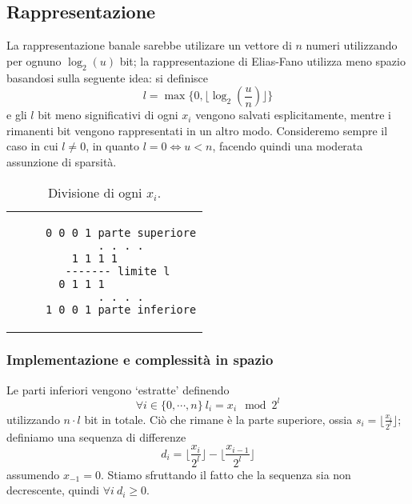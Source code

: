 \subsection{Rappresentazione}
La rappresentazione banale sarebbe utilizare un vettore di $n$ numeri
utilizzando per ognuno $\log_2(u)$ bit; la rappresentazione di Elias-Fano
utilizza meno spazio basandosi sulla seguente idea: si definisce
$$
	l = \max\{0, \lfloor\log_2(\frac{u}{n})\rfloor\}
$$
e gli $l$ bit meno significativi di ogni $x_i$ vengono salvati
esplicitamente, mentre i rimanenti bit vengono rappresentati
in un altro modo. Consideremo sempre il caso in cui $l\neq 0$, in
quanto $l = 0 \iff u < n$, facendo quindi una moderata
assunzione di sparsità.
\begin{table}[h]
	\centering
	\begin{tabular}{c}
		\begin{lstlisting}
	 0 0 0 1 parte superiore
	 . . . .
	 1 1 1 1 		
	 ------- limite l 
	 0 1 1 1 			
	 . . . .
	 1 0 0 1 parte inferiore
    \end{lstlisting}
	\end{tabular}
	\caption{Divisione di ogni $x_i$.}
\end{table}

\subsubsection{Implementazione e complessità in spazio}
Le parti inferiori vengono `estratte' definendo
$$
	\forall i \in \{0, \cdots, n\} ~ l_i = x_i \mod 2^l
$$
utilizzando $n \cdot l$ bit in totale.  Ciò che rimane è la parte superiore, ossia
$s_i = \lfloor{\frac{x_{i}}{2^l}}\rfloor$; definiamo una sequenza di differenze
$$
	d_i = \lfloor{\frac{x_i}{2^l}}\rfloor - \lfloor{\frac{x_{i-1}}{2^l}}\rfloor
$$
assumendo $x_{-1} = 0$. Stiamo sfruttando il fatto che la sequenza sia non
decrescente, quindi $\forall i ~ d_i \geq 0$.

